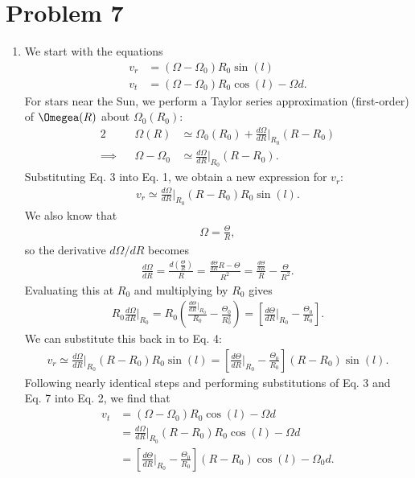 \documentclass[11pt,letterpaper]{article}
\begin{document}
\section*{Problem 7} 
\begin{enumerate}[label=(\alph*)]
    \item We start with the equations 
        \begin{align}
            v_r &= (\Omega - \Omega_0)R_0\sin(l) \\
            v_t &= (\Omega - \Omega_0)R_0\cos(l) - \Omega d.
        \end{align}
        For stars near the Sun, we perform a Taylor series approximation (first-order) of $\Omegea(R)$ about $\Omega_0(R_0)$:
        \begin{alignat}{2}
            &&\Omega(R) &\simeq \Omega_0(R_0) + \frac{d\Omega}{dR}\Big|_{R_0}(R-R_0) \nonumber \\
            \implies&&\Omega - \Omega_0 &\simeq \frac{d\Omega}{dR}\Big|_{R_0}(R-R_0).
        \end{alignat}
        Substituting Eq. 3 into Eq. 1, we obtain a new expression for $v_r$:
        \begin{align}
            v_r \simeq \frac{d\Omega}{dR}\Big|_{R_0}(R-R_0)R_0\sin(l).
        \end{align}
        We also know that 
        \begin{align}
            \Omega = \frac{\Theta}{R},
        \end{align}
        so the derivative $d\Omega/dR$ becomes
        \begin{align}
            \frac{d\Omega}{dR} = \frac{d(\frac{\Theta}{R})}{R} = \frac{\frac{d\Theta}{dR}R - \Theta}{R^2} = \frac{\frac{d\Theta}{dR}}{R} - \frac{\Theta}{R^2}.
        \end{align}
        Evaluating this at $R_0$ and multiplying by $R_0$ gives 
        \begin{align}
            R_0\frac{d\Omega}{dR}\Big|_{R_0} = R_0(\frac{\frac{d\Theta}{dR}\Big|_{R_0}}{R_0} - \frac{\Theta_0}{R_0^2}) = \left[\frac{d\Theta}{dR}\Big|_{R_0} - \frac{\Theta_0}{R_0}\right].
        \end{align}
        We can substitute this back in to Eq. 4:
        \begin{align}
            v_r \simeq \frac{d\Omega}{dR}\Big|_{R_0}(R-R_0)R_0\sin(l) = \left[\frac{d\Theta}{dR}\Big|_{R_0} - \frac{\Theta_0}{R_0}\right](R-R_0)\sin(l).
        \end{align}
        Following nearly identical steps and performing substitutions of Eq. 3 and Eq. 7 into Eq. 2, we find that 
        \begin{align}
            v_t &= (\Omega - \Omega_0)R_0\cos(l) - \Omega d \\
            &= \frac{d\Omega}{dR}\Big|_{R_0}(R-R_0)R_0\cos(l) - \Omega d \\
            &= \left[\frac{d\Theta}{dR}\Big|_{R_0} - \frac{\Theta_0}{R_0}\right](R-R_0)\cos(l) - \Omega_0 d.
        \end{align}
    

\end{enumerate}
\end{document}
